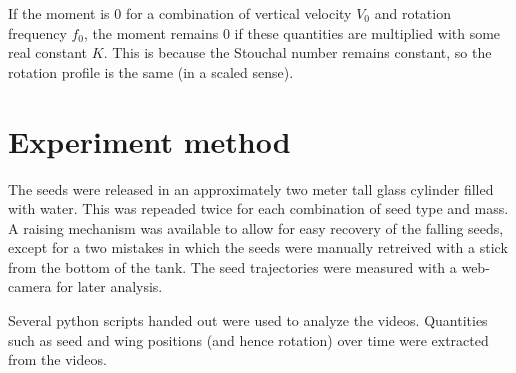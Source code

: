 \documentclass[aps,reprint]{revtex4-1}
\begin{document}
If the moment is 0 for a combination of vertical velocity $V_0$ and rotation
frequency $f_0$, the moment remains 0 if these quantities are multiplied with
some real constant $K$. This is because the Stouchal number remains constant,
so the rotation profile is the same (in a scaled sense).
\section{Experiment method}
The seeds were released in an approximately two meter tall glass cylinder filled
with water. This was repeaded twice for each combination of seed type and mass.
A raising mechanism was available to allow for easy recovery of the falling
seeds, except for a two mistakes in which the seeds were manually retreived with
a stick from the bottom of the tank. The seed trajectories were measured with
a web-camera for later analysis.

Several python scripts handed out were used to analyze the videos. Quantities
such as seed and wing positions (and hence rotation) over time were extracted
from the videos.
\label{sec:method}
\end{document}
